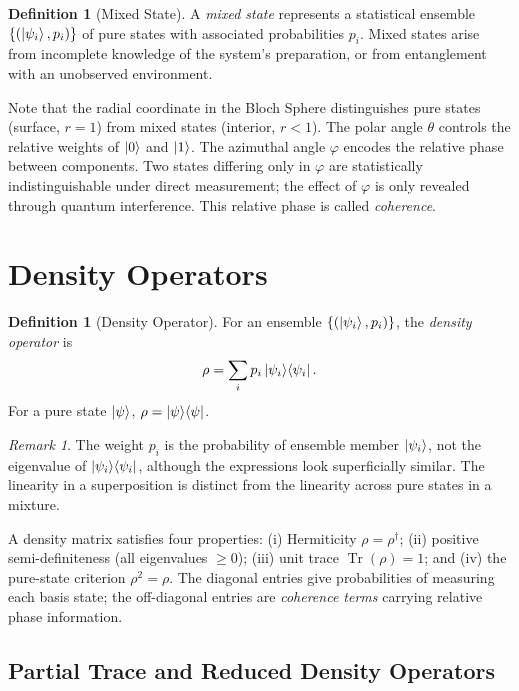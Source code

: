\documentclass[12pt, a4paper, oneside]{report}
\theoremstyle{plain}
\theoremstyle{definition}
\newtheorem{definition}[theorem]{Definition}
\theoremstyle{remark}
\newtheorem{remark}[theorem]{Remark}
\newcommand{\oket}[2]{\ket{#1}\!\bra{#2}}
\DeclareMathOperator{\Tr}{Tr}
\begin{document}
\begin{definition}[Mixed State]
A \emph{mixed state} represents a statistical ensemble $\{(\ket{\psi_i}, p_i)\}$ of pure
states with associated probabilities $p_i$. Mixed states arise from incomplete knowledge of
the system's preparation, or from entanglement with an unobserved environment.
\end{definition}

Note that the radial coordinate in the Bloch Sphere distinguishes pure states (surface, $r=1$) from mixed states (interior,
$r < 1$). The polar angle $\theta$ controls the relative weights of $\ket{0}$ and $\ket{1}$.
The azimuthal angle $\varphi$ encodes the relative phase between components. Two states
differing only in $\varphi$ are statistically indistinguishable under direct measurement;
the effect of $\varphi$ is only revealed through quantum interference. This relative phase is
called \emph{coherence}.

\section{Density Operators}

\begin{definition}[Density Operator]
For an ensemble $\{(\ket{\psi_i}, p_i)\}$, the \emph{density operator} is
\[
  \rho = \sum_i p_i \oket{\psi_i}{\psi_i}.
\]
For a pure state $\ket{\psi}$, $\rho = \oket{\psi}{\psi}$.
\end{definition}

\begin{remark}
The weight $p_i$ is the probability of ensemble member $\ket{\psi_i}$, not the eigenvalue of
$\oket{\psi_i}{\psi_i}$, although the expressions look superficially similar. The linearity
in a superposition is distinct from the linearity across pure states in a mixture.
\end{remark}

A density matrix satisfies four properties: (i) Hermiticity $\rho = \rho^\dagger$;
(ii) positive semi-definiteness (all eigenvalues $\geq 0$); (iii) unit trace $\Tr(\rho) = 1$;
and (iv) the pure-state criterion $\rho^2 = \rho$. The diagonal entries give probabilities of
measuring each basis state; the off-diagonal entries are \emph{coherence terms} carrying
relative phase information.

\subsection{Partial Trace and Reduced Density Operators}
\end{document}
